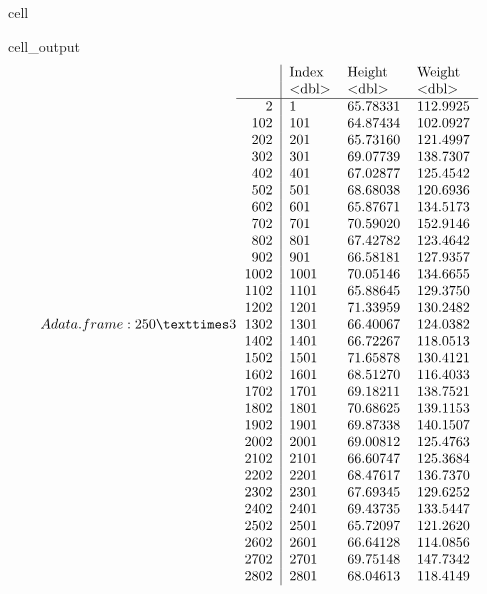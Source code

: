 \documentclass[letterpaper,10pt,english]{jupyterBook}
\begin{document}
\begin{sphinxuseclass}{cell}
\begin{sphinxVerbatimOutput}
\begin{sphinxuseclass}{cell_output}\begin{equation*}
\begin{split}A data.frame: 250 × 3
\begin{tabular}{r|lll}
  & Index & Height & Weight\\
  & <dbl> & <dbl> & <dbl>\\
\hline
	2 &    1 & 65.78331 & 112.9925\\
	102 &  101 & 64.87434 & 102.0927\\
	202 &  201 & 65.73160 & 121.4997\\
	302 &  301 & 69.07739 & 138.7307\\
	402 &  401 & 67.02877 & 125.4542\\
	502 &  501 & 68.68038 & 120.6936\\
	602 &  601 & 65.87671 & 134.5173\\
	702 &  701 & 70.59020 & 152.9146\\
	802 &  801 & 67.42782 & 123.4642\\
	902 &  901 & 66.58181 & 127.9357\\
	1002 & 1001 & 70.05146 & 134.6655\\
	1102 & 1101 & 65.88645 & 129.3750\\
	1202 & 1201 & 71.33959 & 130.2482\\
	1302 & 1301 & 66.40067 & 124.0382\\
	1402 & 1401 & 66.72267 & 118.0513\\
	1502 & 1501 & 71.65878 & 130.4121\\
	1602 & 1601 & 68.51270 & 116.4033\\
	1702 & 1701 & 69.18211 & 138.7521\\
	1802 & 1801 & 70.68625 & 139.1153\\
	1902 & 1901 & 69.87338 & 140.1507\\
	2002 & 2001 & 69.00812 & 125.4763\\
	2102 & 2101 & 66.60747 & 125.3684\\
	2202 & 2201 & 68.47617 & 136.7370\\
	2302 & 2301 & 67.69345 & 129.6252\\
	2402 & 2401 & 69.43735 & 133.5447\\
	2502 & 2501 & 65.72097 & 121.2620\\
	2602 & 2601 & 66.64128 & 114.0856\\
	2702 & 2701 & 69.75148 & 147.7342\\
	2802 & 2801 & 68.04613 & 118.4149\\

\end{tabular}
\end{split}
\end{equation*}
\end{sphinxuseclass}
\end{sphinxVerbatimOutput}
\end{sphinxuseclass}
\end{document}
